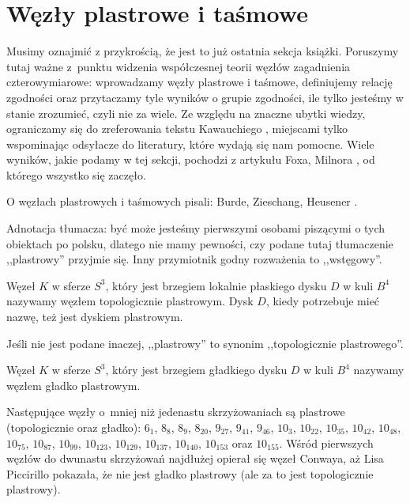 
\section{Węzły plastrowe i taśmowe}
\label{sec:slice}
Musimy oznajmić z przykrością, że jest to już ostatnia sekcja książki.
Poruszymy tutaj ważne z~punktu widzenia współczesnej teorii węzłów zagadnienia czterowymiarowe: wprowadzamy węzły plastrowe i taśmowe, definiujemy relację zgodności oraz przytaczamy tyle wyników o grupie zgodności, ile tylko jesteśmy w stanie zrozumieć, czyli nie za wiele.
Ze względu na znaczne ubytki wiedzy, ograniczamy się do zreferowania tekstu Kawauchiego \cite[s. 154-169]{kawauchi1996}, miejscami tylko wspominając odsyłacze do literatury, które wydają się nam pomocne.
Wiele wyników, jakie podamy w tej sekcji, pochodzi z artykułu Foxa, Milnora \cite{fox1966}, od którego wszystko się zaczęło.
%
%

O węzłach plastrowych i taśmowych pisali: Burde, Zieschang, Heusener \cite[s. 26, 27]{burde2014}.

Adnotacja tłumacza: być może jesteśmy pierwszymi osobami piszącymi o tych obiektach po polsku, dlatego nie mamy pewności, czy podane tutaj tłumaczenie ,,plastrowy'' przyjmie się.
Inny przymiotnik godny rozważenia to ,,wstęgowy''.

\begin{definition}
%
    Węzeł $K$ w sferze $S^3$, który jest brzegiem lokalnie płaskiego dysku $D$ w kuli $B^4$ nazywamy węzłem topologicznie plastrowym. %
    Dysk $D$, kiedy potrzebuje mieć nazwę, też jest dyskiem plastrowym.
\end{definition}

Jeśli nie jest podane inaczej, ,,plastrowy'' to synonim ,,topologicznie plastrowego''.

\begin{definition}
    Węzeł $K$ w sferze $S^3$, który jest brzegiem gładkiego dysku $D$ w kuli $B^4$ nazywamy węzłem gładko plastrowym.
\end{definition}

Następujące węzły o~mniej niż jedenastu skrzyżowaniach są plastrowe (topologicznie oraz gładko): $6_1$, $8_{8}$, $8_{9}$, $8_{20}$, $9_{27}$, $9_{41}$, $9_{46}$, $10_{3}$, $10_{22}$, $10_{35}$, $10_{42}$, $10_{48}$, $10_{75}$, $10_{87}$, $10_{99}$, $10_{123}$, $10_{129}$, $10_{137}$, $10_{140}$, $10_{153}$ oraz $10_{155}$.
Wśród pierwszych węzłów do dwunastu skrzyżowań najdłużej opierał się węzeł Conwaya, aż Lisa Piccirillo \cite{piccirillo2020} pokazała, że nie jest gładko plastrowy (ale za to jest topologicznie plastrowy).
%

